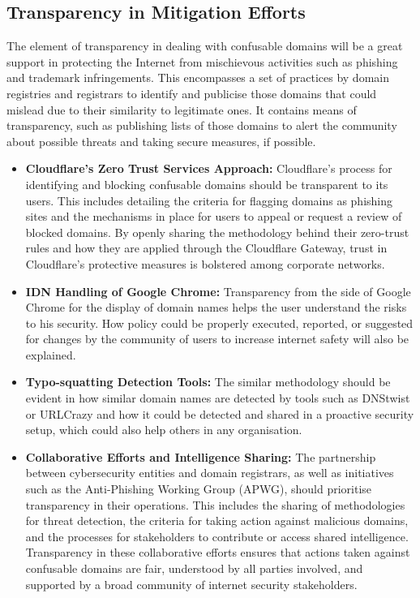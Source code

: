 \subsection{ Transparency in Mitigation Efforts}

The element of transparency in dealing with confusable domains will be a great support in protecting the Internet from mischievous activities such as phishing and trademark infringements. This encompasses a set of practices by domain registries and registrars to identify and publicise those domains that could mislead due to their similarity to legitimate ones. It contains means of transparency, such as publishing lists of those domains to alert the community about possible threats and taking secure measures, if possible.

\begin{itemize}
  \item \textbf{Cloudflare's Zero Trust Services Approach: }Cloudflare's process for identifying and blocking confusable domains should be transparent to its users. This includes detailing the criteria for flagging domains as phishing sites and the mechanisms in place for users to appeal or request a review of blocked domains. By openly sharing the methodology behind their zero-trust rules and how they are applied through the Cloudflare Gateway, trust in Cloudflare's protective measures is bolstered among corporate networks.
  
  
  \item \textbf{IDN Handling of Google Chrome:} Transparency from the side of Google Chrome for the display of domain names helps the user understand the risks to his security. How policy could be properly executed, reported, or suggested for changes by the community of users to increase internet safety will also be explained.

  \item \textbf{Typo-squatting Detection Tools: }The similar methodology should be evident in how similar domain names are detected by tools such as DNStwist or URLCrazy and how it could be detected and shared in a proactive security setup, which could also help others in any organisation.
  
  \item \textbf{Collaborative Efforts and Intelligence Sharing: }The partnership between cybersecurity entities and domain registrars, as well as initiatives such as the Anti-Phishing Working Group (APWG), should prioritise transparency in their operations. This includes the sharing of methodologies for threat detection, the criteria for taking action against malicious domains, and the processes for stakeholders to contribute or access shared intelligence. Transparency in these collaborative efforts ensures that actions taken against confusable domains are fair, understood by all parties involved, and supported by a broad community of internet security stakeholders.
  

\end{itemize}

